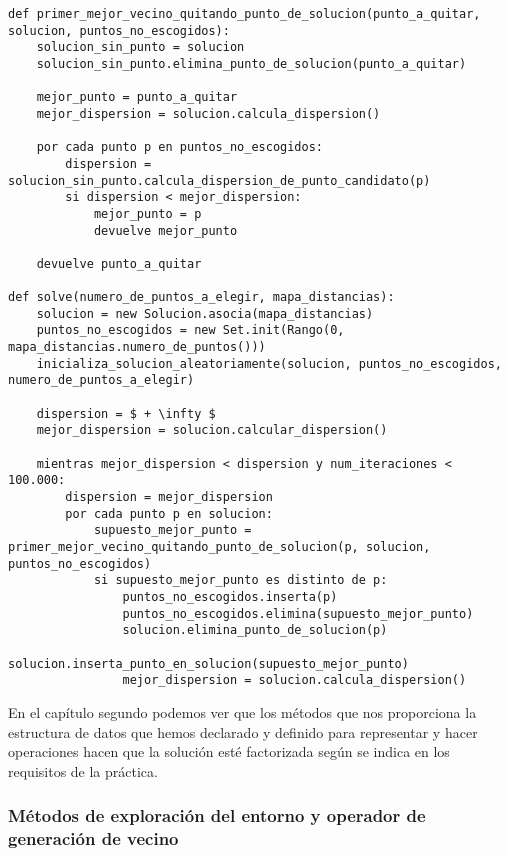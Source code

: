 \begin{minipage}{\textwidth}
\begin{lstlisting}[mathescape=true,caption={Definición del algoritmo de Búsqueda Local.},captionpos=b]
def primer_mejor_vecino_quitando_punto_de_solucion(punto_a_quitar, solucion, puntos_no_escogidos):
    solucion_sin_punto = solucion
    solucion_sin_punto.elimina_punto_de_solucion(punto_a_quitar)

    mejor_punto = punto_a_quitar
    mejor_dispersion = solucion.calcula_dispersion()

    por cada punto p en puntos_no_escogidos:
        dispersion = solucion_sin_punto.calcula_dispersion_de_punto_candidato(p)
        si dispersion < mejor_dispersion:
            mejor_punto = p
            devuelve mejor_punto
    
    devuelve punto_a_quitar

def solve(numero_de_puntos_a_elegir, mapa_distancias):
    solucion = new Solucion.asocia(mapa_distancias)
    puntos_no_escogidos = new Set.init(Rango(0, mapa_distancias.numero_de_puntos()))
    inicializa_solucion_aleatoriamente(solucion, puntos_no_escogidos, numero_de_puntos_a_elegir)

    dispersion = $ + \infty $
    mejor_dispersion = solucion.calcular_dispersion()

    mientras mejor_dispersion < dispersion y num_iteraciones < 100.000:
        dispersion = mejor_dispersion
        por cada punto p en solucion:
            supuesto_mejor_punto = primer_mejor_vecino_quitando_punto_de_solucion(p, solucion, puntos_no_escogidos)
            si supuesto_mejor_punto es distinto de p:
                puntos_no_escogidos.inserta(p)
                puntos_no_escogidos.elimina(supuesto_mejor_punto)
                solucion.elimina_punto_de_solucion(p)
                solucion.inserta_punto_en_solucion(supuesto_mejor_punto)
                mejor_dispersion = solucion.calcula_dispersion()
\end{lstlisting}
\end{minipage}

En el capítulo segundo podemos ver que los métodos que nos proporciona la estructura de datos que hemos declarado y definido para representar y hacer
operaciones hacen que la solución esté factorizada según se indica en los requisitos de la práctica. 

\subsubsection{Métodos de exploración del entorno y operador de generación de vecino}


